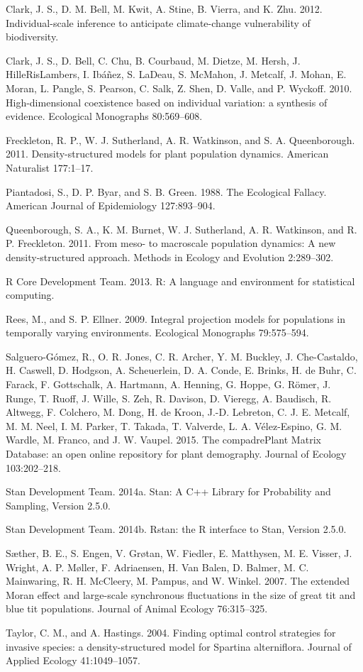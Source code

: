 \documentclass[12pt,]{article}
\begin{document}
Clark, J. S., D. M. Bell, M. Kwit, A. Stine, B. Vierra, and K. Zhu.
2012. Individual-scale inference to anticipate climate-change
vulnerability of biodiversity.

Clark, J. S., D. Bell, C. Chu, B. Courbaud, M. Dietze, M. Hersh, J.
HilleRisLambers, I. Ibáñez, S. LaDeau, S. McMahon, J. Metcalf, J. Mohan,
E. Moran, L. Pangle, S. Pearson, C. Salk, Z. Shen, D. Valle, and P.
Wyckoff. 2010. High-dimensional coexistence based on individual
variation: a synthesis of evidence. Ecological Monographs 80:569--608.

Freckleton, R. P., W. J. Sutherland, A. R. Watkinson, and S. A.
Queenborough. 2011. Density-structured models for plant population
dynamics. American Naturalist 177:1--17.

Piantadosi, S., D. P. Byar, and S. B. Green. 1988. The Ecological
Fallacy. American Journal of Epidemiology 127:893--904.

Queenborough, S. A., K. M. Burnet, W. J. Sutherland, A. R. Watkinson,
and R. P. Freckleton. 2011. From meso- to macroscale population
dynamics: A new density-structured approach. Methods in Ecology and
Evolution 2:289--302.

R Core Development Team. 2013. R: A language and environment for
statistical computing.

Rees, M., and S. P. Ellner. 2009. Integral projection models for
populations in temporally varying environments. Ecological Monographs
79:575--594.

Salguero-Gómez, R., O. R. Jones, C. R. Archer, Y. M. Buckley, J.
Che-Castaldo, H. Caswell, D. Hodgson, A. Scheuerlein, D. A. Conde, E.
Brinks, H. de Buhr, C. Farack, F. Gottschalk, A. Hartmann, A. Henning,
G. Hoppe, G. Römer, J. Runge, T. Ruoff, J. Wille, S. Zeh, R. Davison, D.
Vieregg, A. Baudisch, R. Altwegg, F. Colchero, M. Dong, H. de Kroon,
J.-D. Lebreton, C. J. E. Metcalf, M. M. Neel, I. M. Parker, T. Takada,
T. Valverde, L. A. Vélez-Espino, G. M. Wardle, M. Franco, and J. W.
Vaupel. 2015. The compadrePlant Matrix Database: an open online
repository for plant demography. Journal of Ecology 103:202--218.

Stan Development Team. 2014a. Stan: A C++ Library for Probability and
Sampling, Version 2.5.0.

Stan Development Team. 2014b. Rstan: the R interface to Stan, Version
2.5.0.

Sæther, B. E., S. Engen, V. Grøtan, W. Fiedler, E. Matthysen, M. E.
Visser, J. Wright, A. P. Møller, F. Adriaensen, H. {Van Balen}, D.
Balmer, M. C. Mainwaring, R. H. McCleery, M. Pampus, and W. Winkel.
2007. The extended Moran effect and large-scale synchronous fluctuations
in the size of great tit and blue tit populations. Journal of Animal
Ecology 76:315--325.

Taylor, C. M., and A. Hastings. 2004. Finding optimal control strategies
for invasive species: a density-structured model for Spartina
alterniflora. Journal of Applied Ecology 41:1049--1057.
\end{document}
